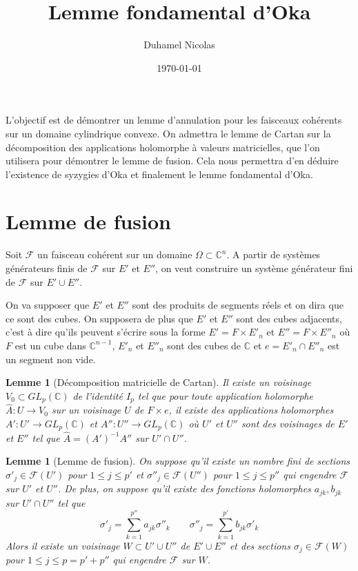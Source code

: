 \documentclass{article}
\newtheorem{lemme}[theoreme]{Lemme}
\theoremstyle{definition}
\theoremstyle{remark}
\begin{document}
\title{Lemme fondamental d'Oka}
\date \today
\author{Duhamel Nicolas}
\maketitle

L'objectif est de démontrer un lemme d'annulation pour les faisceaux cohérents sur un domaine cylindrique convexe. On admettra le lemme de Cartan sur la décomposition des applications holomorphe à valeurs matricielles, que l'on utilisera pour démontrer le lemme de fusion. Cela nous permettra d'en déduire l'existence de syzygies d'Oka et finalement le lemme fondamental d'Oka.

\section{Lemme de fusion}
Soit $\mathcal{F}$ un faisceau cohérent sur un domaine $\Omega \subset \mathbb{C}^n$. A partir de systèmes générateurs finis de $\mathcal{F}$ sur $E'$ et $E''$, on veut construire un système générateur fini de $\mathcal{F}$ sur $E' \cup E''$.

On va supposer que $E'$ et $E''$ sont des produits de segments réels et on dira que ce sont des cubes. On supposera de plus que $E'$ et $E''$ sont des cubes adjacents, c'est à dire qu'ils peuvent s'écrire sous la forme $E'=F \times E'_n$ et $E''=F \times E''_n$ où $F$ est un cube dans $\mathbb{C}^{n-1}$, $E'_n$ et $E''_n$ sont des cubes de $\mathbb{C}$ et $e=E'_n \cap E''_n$ est un segment non vide.

\begin{lemme}[Décomposition matricielle de Cartan]
Il existe un voisinage $V_0 \subset GL_p(\mathbb{C})$ de l'identité $I_p$ tel que pour toute application holomorphe $\hat{A} : U \to V_0$ sur un voisinage $U$ de $F \times e$, il existe des applications holomorphes $A' : U' \to GL_p(\mathbb{C})$ et $A'' : U'' \to GL_p(\mathbb{C})$ où $U'$ et $U''$ sont des voisinages de $E'$ et $E''$ tel que $\hat{A} = (A')^{-1}A''$ sur $U' \cap U''$.
\end{lemme}

\begin{lemme}[Lemme de fusion]
On suppose qu'il existe un nombre fini de sections $\sigma'_j \in \mathcal{F}(U')$ pour $1\leq j \leq p'$ et $\sigma''_j \in \mathcal{F}(U'')$ pour $1\leq j \leq p''$ qui engendre $\mathcal{F}$ sur $U'$ et $U''$. De plus, on suppose qu'il existe des fonctions holomorphes $a_{jk}, b_{jk}$ sur $U' \cap U''$ tel que
\begin{equation*}
\sigma'_j = \sum_{k=1}^{p''} a_{jk}\sigma''_k \qquad
\sigma''_j = \sum_{k=1}^{p'} b_{jk}\sigma'_k
\end{equation*}
Alors il existe un voisinage $W \subset U' \cup U''$ de $E' \cup E''$ et des sections $\sigma_j \in \mathcal{F}(W)$ pour $1\leq j \leq p=p'+p''$ qui engendre $\mathcal{F}$ sur $W$.
\end{lemme}
\end{document}

